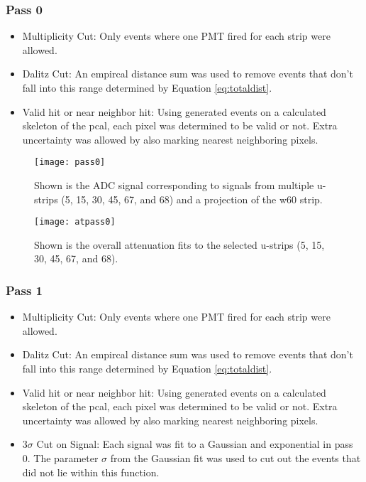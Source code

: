 \subsubsection{Pass 0}
\begin{itemize}
    \item Multiplicity Cut: Only events where one PMT fired for each strip were allowed.
    \item Dalitz Cut: An empircal distance sum was used to remove events that don't fall into 
    this range determined by Equation \ref{eq:totaldist}.
    \item Valid hit or near neighbor hit: Using generated events on a calculated skeleton of 
    the pcal, each pixel was determined to be valid or not. Extra uncertainty was allowed by 
    also marking nearest neighboring pixels.
\end{itemize}

\begin{figure}[h]
    \centering
    \texttt{[image: pass0]}
    \caption{Shown is the ADC signal corresponding to signals from multiple u-strips 
    (5, 15, 30, 45, 67, and 68) and a projection of the w60 strip.}
    \label{fig:pass0}
\end{figure}

\begin{figure}[h]
    \centering
    \texttt{[image: atpass0]}
    \caption{Shown is the overall attenuation fits to the selected u-strips 
    (5, 15, 30, 45, 67, and 68).}
    \label{fig:atpass0}
\end{figure}


\clearpage
\FloatBarrier
\subsubsection{Pass 1}
\begin{itemize}
    \item Multiplicity Cut: Only events where one PMT fired for each strip were allowed.
    \item Dalitz Cut: An empircal distance sum was used to remove events that don't fall 
    into this range determined by Equation \ref{eq:totaldist}.
    \item Valid hit or near neighbor hit: Using generated events on a calculated skeleton
     of the pcal, each pixel was determined to be valid or not. Extra uncertainty was 
     allowed by also marking nearest neighboring pixels.
    \item 3$\sigma$ Cut on Signal: Each signal was fit to a Gaussian and exponential in 
    pass 0. The parameter $\sigma$ from the Gaussian fit was used to cut out the events
     that did not lie within this function.
\end{itemize}



